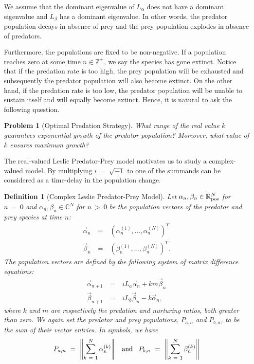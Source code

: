 \documentclass[11pt,reqno]{amsart}
\numberwithin{equation}{section}
\theoremstyle{plain}
\newtheorem{definition}[thm]{Definition}
\newtheorem{problem}[thm]{Problem}
\begin{document}
We assume that the dominant eigenvalue of $L_\alpha$ does not have a dominant eigenvalue and $L_\beta$ has a dominant eigenvalue. 
In other words, the predator population decays in absence of prey and the prey population explodes in absence of predators. 

Furthermore, the populations are fixed to be non-negative. If a population reaches zero 
at some time $n \in \mathbb{Z}^+$, 
we say the species has gone extinct. Notice that if the predation rate is too high, the prey population 
will be exhausted and subsequently the predator 
population will also become extinct. On the other hand, if the predation rate is too low, the predator population will be unable to sustain 
itself and will equally become extinct. Hence, it is natural to ask the following question.

\begin{problem}[Optimal Predation Strategy]
What range of the real value $k$ guarantees exponential growth of the predator population? Moreover, what value of $k$ ensures maximum growth?
\end{problem}

The real-valued Leslie Predator-Prey model motivates us to study a complex-valued model. 
By multiplying $i \ = \  \sqrt{-1}$ to one of the summands can 
be considered as a time-delay in the population change. 

\begin{definition}[Complex Leslie Predator-Prey Model]\label{thm:complexModel}
Let $\alpha_n, \beta_n \in \mathbb R_{\rm pos}^N$ for $n \ = \  0$ and $\alpha_n, \beta_n \in \mathbb C^N$ for $n \ > \  0$ be the population vectors 
of the predator and prey species at time $n$: 
\begin{eqnarray}
    \vec \alpha_n & \ = \ & (\alpha_n^{(1)}, \dots, \alpha_n^{(N)})^T
    \nonumber \\
    \vec \beta_n & \ = \ & (\beta_n^{(1)}, \dots, \beta_n^{(N)})^T.
\end{eqnarray}
 The population 
vectors are defined by the following 
system of matrix difference equations: 
\begin{eqnarray}
    \vec \alpha_{n + 1} & \ = \ & iL_a \vec \alpha_n + k m \vec \beta_n \nonumber \\ 
    \vec \beta_{n + 1} & \ = \ & iL_b \vec \beta_n - k \vec \alpha_n,
\end{eqnarray}
where $k$ and $m$ are respectively the predation and nurturing ratios, both greater than zero. We again set the predator and prey populations, $P_{a, n}$ and $P_{b, n}$, to be the sum 
of their vector entries. In symbols, we have
\begin{equation}
    P_{a, n} \ = \ \left\|\sum_{k \ = \  1}^{N} \alpha^{(k)}_{n} \right\|
    \hspace{3mm} \textrm{and} \hspace{3mm}
    P_{b, n} \ = \ \left\|\sum_{k \ = \  1}^{N} \beta^{(k)}_{n} \right\|
\end{equation}
\end{definition}
\end{document}
